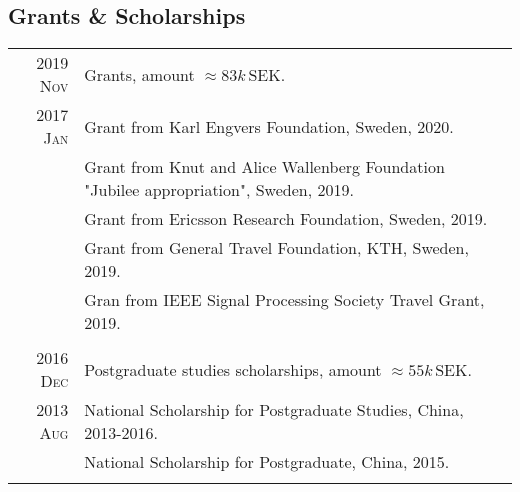 \documentclass[a4paper,10pt]{article}
\begin{document}
\subsection{Grants \& Scholarships}
\begin{savenotes}
  \begin{longtable}{r|p{13cm}}
    \textsc{2019 Nov} & Grants, amount $\approx 83k\,\mathrm{SEK}$.\\
    \textsc{2017 Jan} & Grant from Karl Engvers Foundation, Sweden, 2020. \\

                      &  Grant from Knut and Alice Wallenberg Foundation
                        "Jubilee appropriation", Sweden, 2019. \\
                      & Grant from Ericsson Research Foundation, Sweden, 2019. \\
                      & Grant from General Travel Foundation, KTH, Sweden, 2019. \\
                      & Gran from IEEE Signal Processing Society Travel Grant, 2019. \\
    \multicolumn{2}{c}{} \\
    \textsc{2016 Dec} & Postgraduate studies scholarships, amount $\approx 55k\,\mathrm {SEK}$. \\
    \textsc{2013 Aug} & National Scholarship for Postgraduate Studies, China, 2013-2016. \\
                      & National Scholarship for Postgraduate, China, 2015.\\
    \multicolumn{2}{c}{} \\


\end{longtable}
\end{savenotes}
\end{document}
